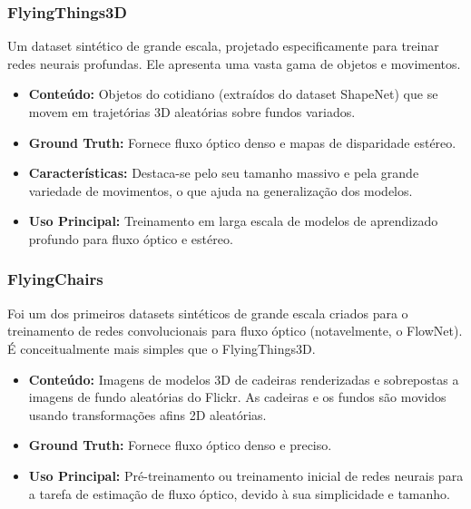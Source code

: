 \documentclass[12pt, a4paper]{article}
\begin{document}
\subsubsection{FlyingThings3D}
Um dataset sintético de grande escala, projetado especificamente para treinar redes neurais profundas. Ele apresenta uma vasta gama de objetos e movimentos.
\begin{itemize}
    \item \textbf{Conteúdo:} Objetos do cotidiano (extraídos do dataset ShapeNet) que se movem em trajetórias 3D aleatórias sobre fundos variados.
    \item \textbf{Ground Truth:} Fornece fluxo óptico denso e mapas de disparidade estéreo.
    \item \textbf{Características:} Destaca-se pelo seu tamanho massivo e pela grande variedade de movimentos, o que ajuda na generalização dos modelos.
    \item \textbf{Uso Principal:} Treinamento em larga escala de modelos de aprendizado profundo para fluxo óptico e estéreo.
\end{itemize}

\subsubsection{FlyingChairs}
Foi um dos primeiros datasets sintéticos de grande escala criados para o treinamento de redes convolucionais para fluxo óptico (notavelmente, o FlowNet). É conceitualmente mais simples que o FlyingThings3D.
\begin{itemize}
    \item \textbf{Conteúdo:} Imagens de modelos 3D de cadeiras renderizadas e sobrepostas a imagens de fundo aleatórias do Flickr. As cadeiras e os fundos são movidos usando transformações afins 2D aleatórias.
    \item \textbf{Ground Truth:} Fornece fluxo óptico denso e preciso.
    \item \textbf{Uso Principal:} Pré-treinamento ou treinamento inicial de redes neurais para a tarefa de estimação de fluxo óptico, devido à sua simplicidade e tamanho.
\end{itemize}
\end{document}

